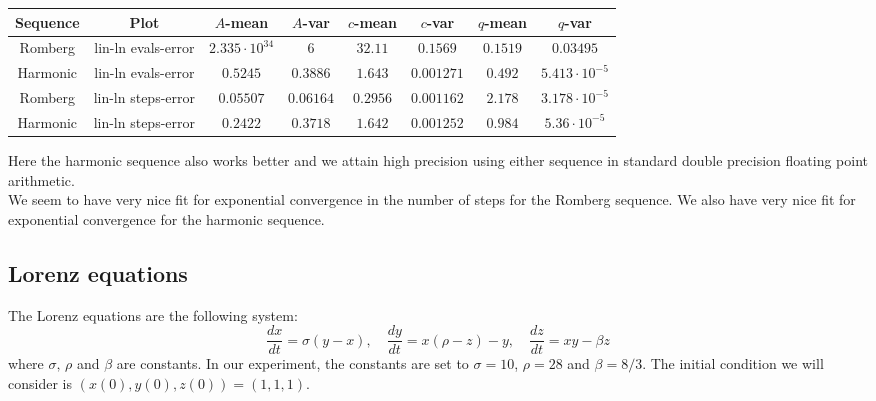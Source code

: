\begin{table}[H]
    \centering
    \small
     \begin{tabular}{c|c||c|c|c|c|c|c}
Sequence & Plot & \(A\)-mean & \(A\)-var & \(c\)-mean & \(c\)-var & \(q\)-mean & \(q\)-var\\\hline
Romberg & lin-ln evals-error & \(2.335\cdot 10^{34}\) & \(6\) & \(32.11\) & \(0.1569\) & \(0.1519\) & \(0.03495\) \\
Harmonic & lin-ln evals-error & \(0.5245\) & \(0.3886\) & \(1.643\) & \(0.001271\) & \(0.492\) & \(5.413\cdot 10^{-5}\) \\
Romberg & lin-ln steps-error & \(0.05507\) & \(0.06164\) & \(0.2956\) & \(0.001162\) & \(2.178\) & \(3.178\cdot 10^{-5}\) \\
Harmonic & lin-ln steps-error & \(0.2422\) & \(0.3718\) & \(1.642\) & \(0.001252\) & \(0.984\) & \(5.36\cdot 10^{-5}\) \\
    \end{tabular}
    \label{tab:my_label}
\end{table}

Here the harmonic sequence also works better and we attain high precision using either sequence in standard double precision floating point arithmetic.\\

We seem to have very nice fit for exponential convergence in the number of steps for the Romberg sequence. We also have very nice fit for exponential convergence for the harmonic sequence.

\subsection{Lorenz equations}

The Lorenz equations are the following system: 
\[
\frac{dx}{dt} = \sigma (y-x),\quad \frac{dy}{dt} = x(\rho - z) - y,\quad \frac{dz}{dt} = xy - \beta z
\]
where \(\sigma,\,\rho\) and \(\beta\) are constants. In our experiment, the constants are set to \(\sigma = 10\), \(\rho = 28\) and \(\beta = 8/3\). The initial condition we will consider is \((x(0),y(0),z(0)) = (1,1,1)\).\\

